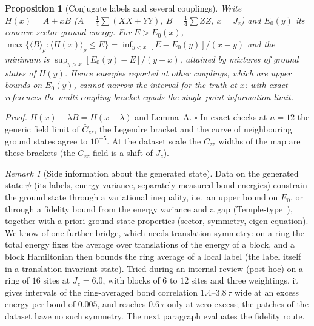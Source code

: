 \documentclass[aps,prx,onecolumn,10pt,nofootinbib,longbibliography,floatfix]{revtex4-2}
\newtheorem{proposition}{Proposition}
\theoremstyle{remark}
\newtheorem*{remark}{Remark}
\newcommand{\Jz}{J_z}
\newcommand{\Czz}{\bar C_{zz}}
\begin{document}
\begin{proposition}[Conjugate labels and several couplings]
Write $H(x)=A+xB$ ($A=\frac14\sum(XX+YY)$, $B=\frac14\sum ZZ$, $x=\Jz$) and $E_0(y)$ its concave sector ground energy. %
For $E>E_0(x)$, $\max\{\langle B\rangle_\rho:\langle H(x)\rangle_\rho\le E\}=\inf_{y<x}[E-E_0(y)]/(x-y)$ and the %
minimum is $\sup_{y>x}[E_0(y)-E]/(y-x)$, attained by mixtures of ground states of $H(y)$. Hence energies reported at %
other couplings, which are upper bounds on $E_0(y)$, cannot narrow the interval for the truth at $x$: with exact %
references the multi-coupling bracket equals the single-point information limit.
\end{proposition}
\noindent\emph{Proof.} $H(x)-\lambda B=H(x-\lambda)$ and Lemma~A. $\square$ In exact checks at $n=12$ the generic %
field limit of $\Czz$, the Legendre bracket and the curve of neighbouring ground states agree to $10^{-5}$. At the %
dataset scale the $\Czz$ widths of the map are these brackets (the $\Czz$ field is a shift of $\Jz$).

\begin{remark}[Side information about the generated state]
Data on the generated state $\psi$ (its labels, energy variance, separately measured bond energies) constrain the
ground state through a variational inequality, i.e.\ an upper bound on $E_0$, or through a fidelity bound from the %
energy variance and a gap (Temple-type~\cite{temple1928}), together with a-priori ground-state properties (sector, symmetry, eigen-equation). We know
of one further bridge, which needs translation symmetry: on a ring the total energy fixes the average over
translations of the energy of a block, and a block Hamiltonian then bounds the ring average of a local label (the
label itself in a translation-invariant state). Tried during an internal review (post hoc) on a ring of
$16$ sites at $\Jz=6.0$, with blocks of $6$ to $12$ sites and three weightings, it gives intervals of the ring-averaged bond %
correlation $1.4$--$3.8\,\tau$ wide at an excess energy per bond of $0.005$, and reaches $0.6\,\tau$ only at zero %
excess; the patches of the dataset have no such symmetry. The next paragraph evaluates the fidelity route.
\end{remark}
\end{document}
